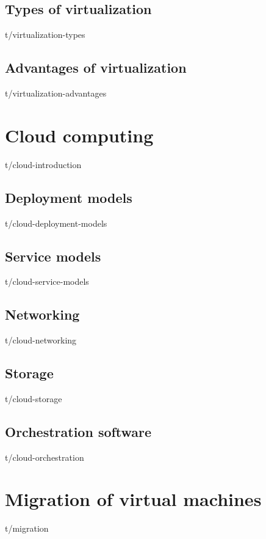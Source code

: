 \documentclass[12pt,oneside,a4paper]{report} %
\begin{document}
		\section{Types of virtualization}
		{t/virtualization-types}

		\section{Advantages of virtualization}
		{t/virtualization-advantages}

		\label{subsec:advantages-of-virtualization}

	\chapter{Cloud computing}
		{t/cloud-introduction}

		\section{Deployment models}
		{t/cloud-deployment-models}

		\section{Service models}
		{t/cloud-service-models}

		\section{Networking}
		{t/cloud-networking}

		\section{Storage}
		{t/cloud-storage}

		\section{Orchestration software}
		{t/cloud-orchestration}


	\chapter{Migration of virtual machines}
		{t/migration}
\end{document}

